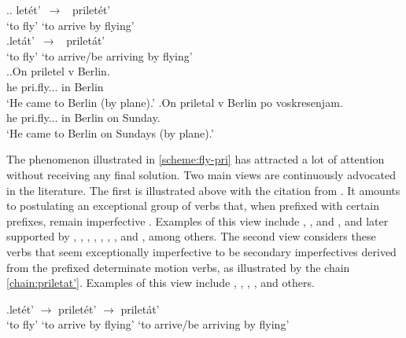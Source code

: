 \ex.\label{scheme:fly-pri}\ag. let\'{e}t'\textsuperscript{\IPF}~$\to$~ prilet\'{e}t'\textsuperscript{\PF}\\
{`to fly'} {`to arrive by flying'}\\
\bg.let\'{a}t'\textsuperscript{\IPF}~$\to$~ prilet\'{a}t'\textsuperscript{\IPF}\\
{`to fly'} {`to arrive/be arriving by flying'}\\

\ex.\label{ex:fly-pri}\ag.\label{ex:fly-pri1}On priletel\textsuperscript{\PF} v Berlin.\\
he pri.fly... in Berlin\\
\trans `He came to Berlin (by plane).'
\bg.\label{ex:fly-pri2}On priletal\textsuperscript{\IPF} v Berlin po voskresenjam.\\
he pri.fly... in Berlin on Sunday.\\
\trans `He came to Berlin on Sundays (by plane).'

The phenomenon illustrated in \ref{scheme:fly-pri} has attracted a lot of attention without receiving any final solution. Two main views are continuously advocated in the literature. The first is illustrated above with the citation from \citet{Titelbaum:90}. It amounts to postulating an exceptional group of verbs that, when prefixed with certain prefixes, remain imperfective   . Examples of this view include \citet[46]{Meillet:1902}, \citet[5]{Mazon:1908}, and \citet{Vondrak:1908}, and later supported by \citet{Shaxmatov:41}, \citet{Gvozdev:73}, \citet{Vinogradov:72}, \citet{Townsend:75}, \citet{Shvedova:82}, \citet{Wade:92}, \citet{Nesset:08}, and \citet{Janda:10}, among others. The second view considers these verbs that seem exceptionally imperfective to be secondary imperfectives  derived from the prefixed determinate motion verbs, as illustrated by the chain \ref{chain:priletat'}. Examples of this view include \citet{Regnell:44}, \citet[337-344]{Isachenko:60}, \citet[87-95]{ZaliznjakShmelev:00}, \citet{Romanova:06}, and others.

\exg.\label{chain:priletat'}{let\'{e}t'\textsuperscript{\IPF}} {$\to$} {prilet\'{e}t'\textsuperscript{\PF}} {$\to$} prilet\'{a}t'\textsuperscript{\IPF}\\
{`to fly'} {} {`to arrive by flying'} {} {`to arrive/be arriving by flying'}\\

